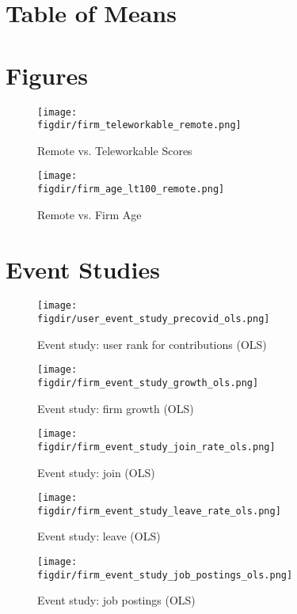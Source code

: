 \documentclass{article}
\newcommand{\cleanedresultsdir}{../../results/cleaned}
\newcommand{\figdir}{../../results/figures}
\begin{document}
\section{Table of Means}
\begin{table}[H]
  \centering
  
\end{table}

\section{Figures}
\begin{figure}[H]
  \centering
  \texttt{[image: \\figdir/firm\_teleworkable\_remote.png]}
  \caption{Remote vs. Teleworkable Scores}
\end{figure}

\begin{figure}[H]
  \centering
  \texttt{[image: \\figdir/firm\_age\_lt100\_remote.png]}
  \caption{Remote vs. Firm Age}
\end{figure}

\section{Event Studies}
\begin{figure}[H]
  \centering
  \texttt{[image: \\figdir/user\_event\_study\_precovid\_ols.png]}
  \caption{Event study: user rank for contributions (OLS)}
\end{figure}

\begin{figure}[H]
  \centering
  \texttt{[image: \\figdir/firm\_event\_study\_growth\_ols.png]}
  \caption{Event study: firm growth (OLS)}
\end{figure}

\begin{figure}[H]
  \centering
  \texttt{[image: \\figdir/firm\_event\_study\_join\_rate\_ols.png]}
  \caption{Event study: join (OLS)}
\end{figure}

\begin{figure}[H]
  \centering
  \texttt{[image: \\figdir/firm\_event\_study\_leave\_rate\_ols.png]}
  \caption{Event study: leave (OLS)}
\end{figure}

\begin{figure}[H]
  \centering
  \texttt{[image: \\figdir/firm\_event\_study\_job\_postings\_ols.png]}
  \caption{Event study: job postings (OLS)}
\end{figure}
\end{document}

